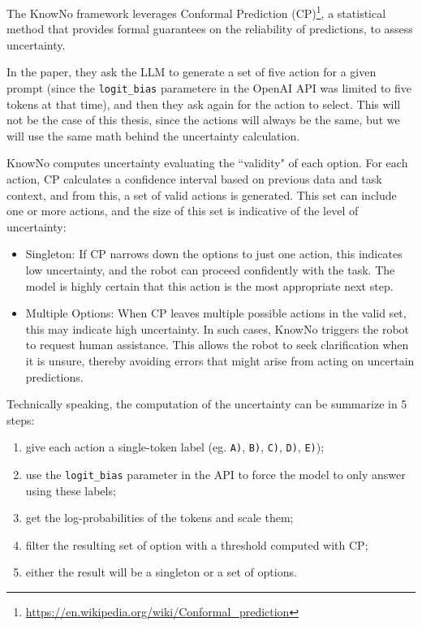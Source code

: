 The KnowNo framework leverages Conformal Prediction (CP)\footnote{\url{https://en.wikipedia.org/wiki/Conformal_prediction}},
a statistical method that provides formal guarantees on the reliability of
predictions, to assess uncertainty.

In the paper, they ask the LLM to generate a set of five action for a given
prompt (since the \texttt{logit\_bias} parametere in the OpenAI API was limited
to five tokens at that time), and then they ask again for the action to select. This
will not be the case of this thesis, since the actions will always be the same, but
we will use the same math behind the uncertainty calculation.

KnowNo computes uncertainty evaluating the ``validity" of each option. For each action,
CP calculates a confidence interval based on previous data and task context, and
from this, a set of valid actions is generated. This set can include one or more
actions, and the size of this set is indicative of the level of uncertainty:
\begin{itemize}
  \item Singleton: If CP narrows down the options to just one action, this indicates
    low uncertainty, and the robot can proceed confidently with the task. The model
    is highly certain that this action is the most appropriate next step.

  \item Multiple Options: When CP leaves multiple possible actions in the valid
    set, this may indicate high uncertainty. In such cases, KnowNo triggers the robot
    to request human assistance. This allows the robot to seek clarification
    when it is unsure, thereby avoiding errors that might arise from acting on uncertain
    predictions.
\end{itemize}

Technically speaking, the computation of the uncertainty can be summarize in 5 steps:
\begin{enumerate}
  \item give each action a single-token label (eg. \texttt{A)}, \texttt{B)}, \texttt{C)},
    \texttt{D)}, \texttt{E)});

  \item use the \texttt{logit\_bias} parameter in the API to force the model to
    only answer using these labels;

  \item get the log-probabilities of the tokens and scale them;

  \item filter the resulting set of option with a threshold computed with CP;

  \item either the result will be a singleton or a set of options.
\end{enumerate}

